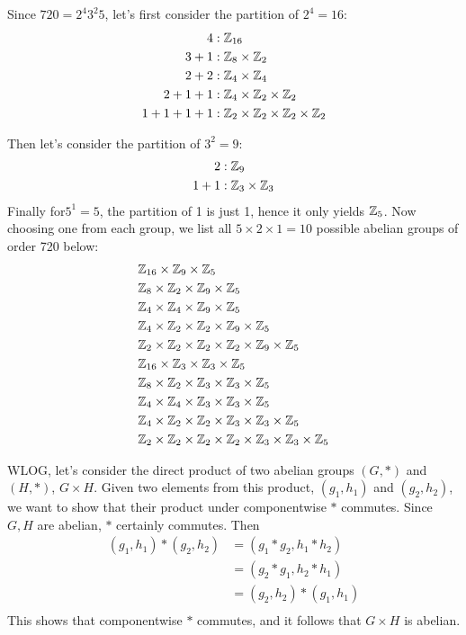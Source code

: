 \documentclass[12pt]{article}
\begin{document}
\begin{problem}[11.24]
	Since $ 720=2^{4} 3^2 5$, let's first consider the partition of $ 2^{4}=16$:
	\begin{align*}
		4&: \mathbb{Z}_{16}\\
		3+1&: \mathbb{Z}_8 \times \mathbb{Z}_2\\
		2+2&: \mathbb{Z}_4 \times \mathbb{Z}_4\\
		2+1+1&: \mathbb{Z}_4 \times \mathbb{Z}_2 \times \mathbb{Z}_2\\
		1+1+1+1&: \mathbb{Z}_2 \times \mathbb{Z}_2 \times \mathbb{Z}_2 \times \mathbb{Z}_2
	\end{align*}
\end{problem}
Then let's consider the partition of $ 3^2=9$:
\begin{align*}
	2&: \mathbb{Z}_9\\
	1+1&: \mathbb{Z}_3 \times \mathbb{Z}_3 
\end{align*}
Finally for$ 5^{1} = 5$, the partition of 1 is just 1, hence it only yields $ \mathbb{Z}_5$. Now choosing one from each group, we list all $ 5\times 2\times 1 =10 $ possible abelian groups of order 720 below:
\begin{align*}
	&\mathbb{Z}_{16} \times \mathbb{Z}_9 \times \mathbb{Z}_5\\
	& \mathbb{Z}_8 \times \mathbb{Z}_2 \times \mathbb{Z}_9 \times \mathbb{Z}_5\\
	& \mathbb{Z}_4 \times \mathbb{Z}_4 \times \mathbb{Z}_9 \times \mathbb{Z}_5\\
	& \mathbb{Z}_4 \times \mathbb{Z}_2 \times \mathbb{Z}_2 \times \mathbb{Z}_9 \times \mathbb{Z}_5\\
	& \mathbb{Z}_2 \times \mathbb{Z}_2 \times \mathbb{Z}_2 \times \mathbb{Z}_2 \times \mathbb{Z}_9 \times \mathbb{Z}_5\\
	& \mathbb{Z}_{16} \times \mathbb{Z}_3 \times \mathbb{Z}_3 \times \mathbb{Z}_5\\
	& \mathbb{Z}_8 \times \mathbb{Z}_2 \times \mathbb{Z}_3 \times \mathbb{Z}_3 \times \mathbb{Z}_5\\
	& \mathbb{Z}_4 \times \mathbb{Z}_4 \times \mathbb{Z}_3 \times \mathbb{Z}_3 \times \mathbb{Z}_5\\
	& \mathbb{Z}_4 \times \mathbb{Z}_2 \times \mathbb{Z}_2 \times \mathbb{Z}_3 \times \mathbb{Z}_3 \times \mathbb{Z}_5\\
	& \mathbb{Z}_2 \times \mathbb{Z}_2 \times \mathbb{Z}_2 \times \mathbb{Z}_2 \times \mathbb{Z}_3 \times \mathbb{Z}_3 \times \mathbb{Z}_5\\
\end{align*}
\begin{problem}[11.46]
	WLOG, let's consider the direct product of two abelian groups $ (G,*)$ and  $ (H,*)$,  $ G\times H$. Given two elements from this product, $ (g_1, h_1)$ and $ (g_2,h_2)$, we want to show that their product under componentwise $ *$ commutes. Since  $ G, H$ are abelian,  $ *$ certainly commutes. Then
	 \begin{align*}
		 (g_1, h_1) * (g_2, h_2) &= (g_1*g_2, h_1*h_2) \\
					 &= (g_2* g_1, h_2*h_1) \\
					 &= (g_2,h_2) * (g_1,h_1) \\
	\end{align*}
	This shows that componentwise $ *$ commutes, and it follows that  $ G\times H$ is abelian.
\end{problem}
\end{document}
